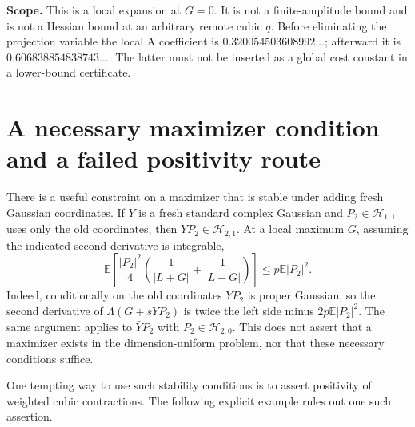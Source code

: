 \documentclass[11pt]{article}
\newcommand{\E}{\mathbb E}
\newcommand{\HH}{\mathcal H}
\begin{document}
\textbf{Scope.} This is a local expansion at $G=0$. It is not a finite-amplitude
bound and is not a Hessian bound at an arbitrary remote cubic $q$.
Before eliminating the projection variable the local A coefficient is
$0.320054503608992\ldots$; afterward it is $0.606838854838743\ldots$.
The latter must not be inserted as a global cost constant in a lower-bound certificate.

\section{A necessary maximizer condition and a failed positivity route}
There is a useful constraint on a maximizer that is stable under adding
fresh Gaussian coordinates. If $Y$ is a fresh standard complex Gaussian and
$P_2\in\HH_{1,1}$ uses only the old coordinates, then $YP_2\in\HH_{2,1}$.
At a local maximum $G$, assuming the indicated second derivative is integrable,
\begin{equation}\label{eq:stability}
 \E\left[\frac{|P_2|^2}{4}
 \left(\frac1{|L+G|}+\frac1{|L-G|}\right)\right]
 \le p\E|P_2|^2.
\end{equation}
Indeed, conditionally on the old coordinates $YP_2$ is proper Gaussian, so
the second derivative of $\Lambda(G+sYP_2)$ is twice the left side minus
$2p\E|P_2|^2$. The same argument applies to $\bar YP_2$ with
$P_2\in\HH_{2,0}$. This does not assert that a maximizer exists in the
dimension-uniform problem, nor that these necessary conditions suffice.

One tempting way to use such stability conditions is to assert positivity
of weighted cubic contractions. The following explicit example rules out
one such assertion.
\end{document}
